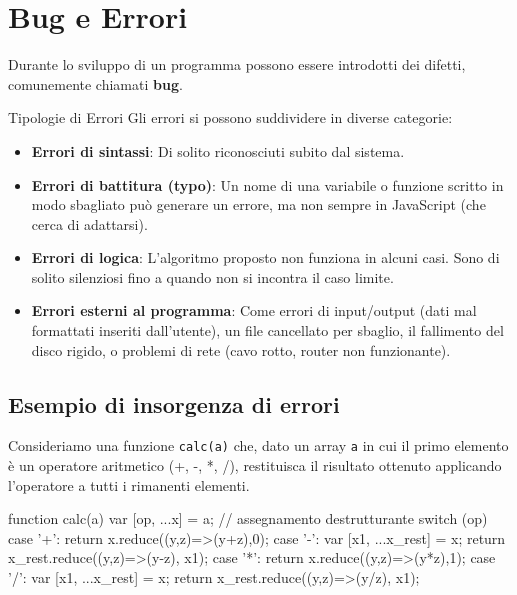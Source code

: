 \section{Bug e Errori}

Durante lo sviluppo di un programma possono essere introdotti dei difetti, comunemente chiamati \textbf{bug}.

\begin{definition}{Tipologie di Errori}
Gli errori si possono suddividere in diverse categorie:
\begin{itemize}
    \item \textbf{Errori di sintassi}: Di solito riconosciuti subito dal sistema.
    \item \textbf{Errori di battitura (typo)}: Un nome di una variabile o funzione scritto in modo sbagliato può generare un errore, ma non sempre in JavaScript (che cerca di adattarsi).
    \item \textbf{Errori di logica}: L'algoritmo proposto non funziona in alcuni casi. Sono di solito silenziosi fino a quando non si incontra il caso limite.
    \item \textbf{Errori esterni al programma}: Come errori di input/output (dati mal formattati inseriti dall'utente), un file cancellato per sbaglio, il fallimento del disco rigido, o problemi di rete (cavo rotto, router non funzionante).
\end{itemize}
\end{definition}

\subsection{Esempio di insorgenza di errori}
Consideriamo una funzione \texttt{calc(a)} che, dato un array \texttt{a} in cui il primo elemento è un operatore aritmetico (+, -, *, /), restituisca il risultato ottenuto applicando l'operatore a tutti i rimanenti elementi.

\begin{jsbox}[title={Funzione calc (versione con bug silenti)}]
function calc(a) {
  var [op, ...x] = a; // assegnamento destrutturante
  switch (op) {
    case '+': return x.reduce((y,z)=>(y+z),0);
    case '-': 
      var [x1, ...x_rest] = x; 
      return x_rest.reduce((y,z)=>(y-z), x1);
    case '*': return x.reduce((y,z)=>(y*z),1);
    case '/': 
      var [x1, ...x_rest] = x; 
      return x_rest.reduce((y,z)=>(y/z), x1);
  }
}
\end{jsbox}

